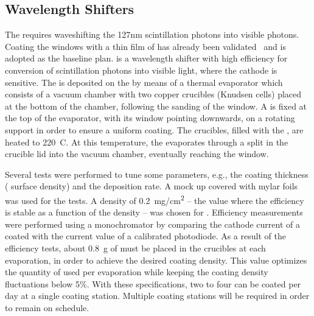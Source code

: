 \subsection{Wavelength Shifters}
\label{sec:fddp-pd-2.4}

The   requires waveshifting the \si{127}{nm} scintillation photons into visible photons. %
Coating the  windows with a thin film of  
has already been validated~\cite{tpb} and is adopted as the baseline plan.  is a wavelength shifter with high efficiency for conversion of \lar scintillation  photons into visible light, where the  cathode is sensitive. The  is deposited on the  by means of a thermal evaporator which consists of a vacuum chamber with two copper crucibles (Knudsen cells) placed at the bottom of the chamber, following the sanding of the  window. A  is fixed at the top of the evaporator, with its window pointing downwards, on a rotating support in order to ensure a uniform coating. The crucibles, filled with the , are heated to \SI{220}{C}. At this temperature, the  evaporates through a split in the crucible lid into the vacuum chamber, eventually reaching the  window.

Several tests were performed to tune some parameters, e.g., the coating thickness ( surface density) and the deposition rate. A  mock up covered with mylar foils was used for the tests. A  density of \SI{0.2}{mg/cm^2} -- the value where the  efficiency is stable as a function of the density -- was chosen for . Efficiency measurements were performed using a  monochromator by comparing the cathode current of a coated  with the current value of a calibrated photodiode. As a result of the efficiency tests, about \SI{0.8}{g} of  must be placed in the crucibles at each evaporation, in order to achieve the desired  coating density. %
This value optimizes the quantity of  used per evaporation while keeping %
the coating density fluctuations below \num{5}$\%$. With these specifications, two to four  can be coated per day at a single coating station. %
Multiple coating stations will be required in order to remain on schedule. %

